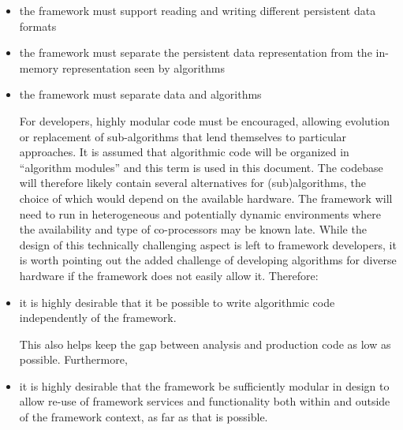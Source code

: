 \documentclass[../main-v1.tex]{subfiles}
\begin{document}
\begin{itemize}
\item  the framework must support reading and writing different persistent data formats

\item the framework must separate the persistent data representation from the in-memory representation seen by algorithms

\item the framework must separate data and algorithms 

For developers, highly modular code must be encouraged, allowing evolution or replacement of sub-algorithms that lend themselves to particular approaches.  It is assumed that algorithmic code will be organized in “algorithm modules” and this term is used in this document.  The codebase will therefore likely contain several alternatives for (sub)algorithms, the choice of which would depend on the available hardware.  The framework will need to run in heterogeneous and potentially dynamic environments where the availability and type of co-processors may be known late.  While the design of this technically challenging aspect is left to framework developers, it is worth pointing out the added challenge of developing algorithms for diverse hardware if the framework does not easily allow it.  Therefore:

\item it is highly desirable that it be possible to write algorithmic code independently of the framework.

This also helps keep the gap between analysis and production code as low as possible.  Furthermore, 

\item it is highly desirable that the framework be sufficiently modular in design to allow re-use of framework services and functionality both within and outside of the framework context, as far as that is possible.






\end{itemize}
\end{document}
